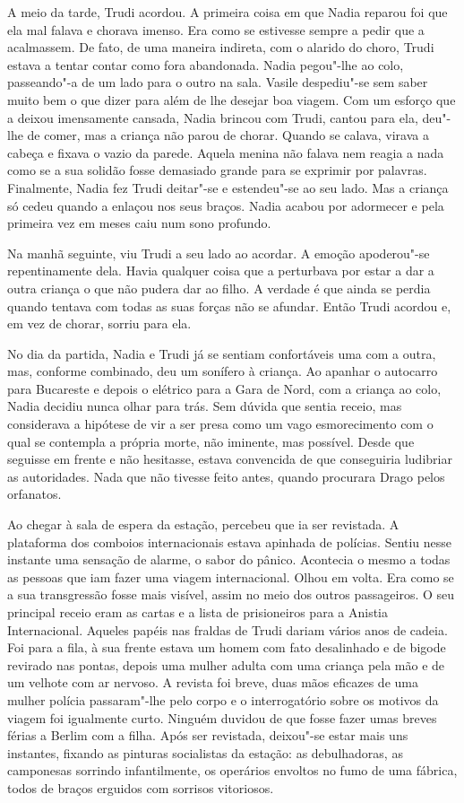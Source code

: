 A meio da tarde, Trudi acordou. A primeira coisa em
que Nadia reparou foi que ela mal falava e chorava imenso. Era como se
estivesse sempre a pedir que a acalmassem. De fato, de uma maneira
indireta, com o alarido do choro, Trudi estava a tentar contar como
fora abandonada. Nadia pegou"-lhe ao colo, passeando"-a de um lado para o
outro na sala. Vasile despediu"-se sem saber muito bem o que dizer para
além de lhe desejar boa viagem. Com um esforço que a deixou imensamente
cansada, Nadia brincou com Trudi, cantou para ela, deu"-lhe de comer, mas
a criança não parou
de chorar. Quando se calava, virava a cabeça e fixava o vazio da parede.
Aquela menina não falava nem reagia a nada como se a sua solidão fosse
demasiado grande para se exprimir por palavras. Finalmente, Nadia fez
Trudi deitar"-se e estendeu"-se ao seu lado. Mas a criança só cedeu quando
a enlaçou nos seus braços. Nadia acabou por adormecer e pela primeira
vez em meses caiu num sono profundo.

Na manhã seguinte, viu Trudi a seu lado ao acordar. A emoção apoderou"-se
repentinamente dela. Havia qualquer coisa que a perturbava por estar a
dar a outra criança o que não pudera dar ao filho. A verdade é que ainda
se perdia quando tentava com todas as suas forças não se afundar. Então
Trudi acordou e, em vez de chorar, sorriu para ela.

\bigskip

No dia da partida, Nadia e Trudi já se sentiam confortáveis uma com a
outra, mas, conforme combinado, deu um sonífero à criança. Ao apanhar o
autocarro para Bucareste e depois o elétrico para a Gara de Nord, com
a criança ao colo, Nadia decidiu nunca olhar para trás. Sem dúvida que
sentia receio, mas considerava a hipótese de vir a ser presa como um
vago esmorecimento com o qual se contempla a própria morte, não
iminente, mas possível. Desde que seguisse em frente e não hesitasse,
estava convencida de que conseguiria ludibriar as autoridades. Nada
que não tivesse feito antes, quando procurara Drago pelos orfanatos.

Ao chegar à sala de espera da estação, percebeu que ia ser revistada. A
plataforma dos comboios internacionais
estava apinhada de polícias. Sentiu nesse instante uma sensação de
alarme, o sabor do pânico. Acontecia o mesmo a todas as pessoas que iam
fazer uma viagem internacional. Olhou em volta. Era como se a sua
transgressão fosse mais visível, assim no meio dos outros passageiros. O
seu principal receio eram as cartas e a lista de prisioneiros para a
Anistia Internacional. Aqueles papéis nas fraldas de Trudi dariam
vários anos de cadeia. Foi para a fila, à sua frente estava um homem com
fato desalinhado e de bigode revirado nas pontas, depois uma mulher
adulta com uma criança pela mão e de um velhote com ar nervoso. A
revista foi breve, duas mãos eficazes de uma mulher polícia passaram"-lhe
pelo corpo e o interrogatório sobre os motivos da viagem foi
igualmente curto. Ninguém duvidou de que fosse fazer umas breves férias
a Berlim com a filha. Após ser revistada, deixou"-se estar mais uns
instantes, fixando as pinturas socialistas da estação: as debulhadoras, as camponesas sorrindo infantilmente, os operários envoltos no fumo
de uma fábrica, todos de braços erguidos com sorrisos vitoriosos.

